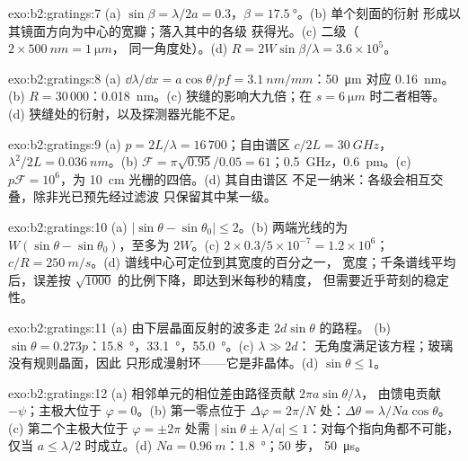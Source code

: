 \begin{solution}{exo:b2:gratings:7}
(a) $\sin\beta = \lambda/2a = 0.3$，$\beta = \qty{17.5}{\degree}$。(b) 单个刻面的衍射
形成以其镜面方向为中心的宽瓣；落入其中的各级
获得光。(c) 二级（$2 \times \qty{500}{nm} = \qty{1}{\micro m}$，
同一角度处）。(d) $R = 2W\sin\beta/\lambda = 3.6 \times 10^5$。
\end{solution}

\begin{solution}{exo:b2:gratings:8}
(a) $\dd\lambda/\dd x = a\cos\theta/pf = \qty{3.1}{nm/mm}$：\qty{50}{\micro m} 对应 \qty{0.16}{nm}。(b)
$R = 30\,000$：\qty{0.018}{nm}。(c) 狭缝的影响大九倍；在 $s = \qty{6}{\micro m}$ 时二者相等。
(d) 狭缝处的衍射，以及探测器光能不足。
\end{solution}

\begin{solution}{exo:b2:gratings:9}
(a) $p = 2L/\lambda = 16\,700$；自由谱区 $c/2L = \qty{30}{GHz}$，$\lambda^2/2L = \qty{0.036}{nm}$。(b) $\mathcal F
= \pi\sqrt{0.95}/0.05 = 61$；\qty{0.5}{GHz}，\qty{0.6}{pm}。(c) $p\mathcal F = 10^6$，为
\qty{10}{cm} 光栅的四倍。(d) 其自由谱区
不足一纳米：各级会相互交叠，除非光已预先经过滤波
只保留其中某一级。
\end{solution}

\begin{solution}{exo:b2:gratings:10}
(a) $|\sin\theta - \sin\theta_0| \le 2$。(b) 两端光线的为
$W(\sin\theta - \sin\theta_0)$，至多为 $2W$。(c) $2 \times 0.3/5 \times 10^{-7} = 1.2 \times 10^6$；$c/R
= \qty{250}{m/s}$。(d) 谱线中心可定位到其宽度的百分之一，
宽度；千条谱线平均后，误差按 $\sqrt{1000}$ 的比例下降，即达到米每秒的精度，
但需要近乎苛刻的稳定性。
\end{solution}

\begin{solution}{exo:b2:gratings:11}
(a) 由下层晶面反射的波多走 $2d\sin\theta$ 的路程。
(b) $\sin\theta = 0.273p$：\qty{15.8}{\degree}，\qty{33.1}{\degree}，\qty{55.0}{\degree}。(c) $\lambda \gg 2d$：
无角度满足该方程；玻璃没有规则晶面，因此
只形成漫射环——它是非晶体。(d) $\sin\theta \le 1$。
\end{solution}

\begin{solution}{exo:b2:gratings:12}
(a) 相邻单元的相位差由路径贡献 $2\pi a\sin\theta/\lambda$，
由馈电贡献 $-\psi$；主极大位于 $\varphi = 0$。(b) 第一零点位于
$\Delta\varphi = 2\pi/N$ 处：$\Delta\theta = \lambda/Na\cos\theta$。(c) 第二个主极大位于
$\varphi = \pm2\pi$ 处需 $|\sin\theta \pm \lambda/a| \le 1$：对每个指向角都不可能，
仅当 $a \le \lambda/2$ 时成立。(d) $Na = \qty{0.96}{m}$：\qty{1.8}{\degree}；$50$ 步，
\qty{50}{\micro s}。
\end{solution}

